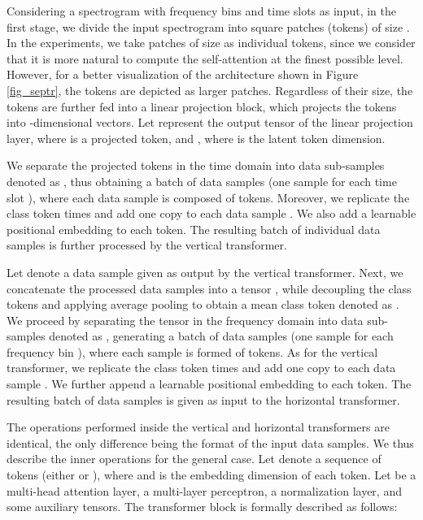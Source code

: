 \documentclass[a4paper]{article}
\begin{document}
Considering a spectrogram with  frequency bins and  time slots as input, in the first stage, we divide the input spectrogram into  square patches (tokens) of size . 
In the experiments, we take patches of size  as individual tokens, since we consider that it is more natural to compute the self-attention at the finest possible level.
However, for a better visualization of the architecture shown in Figure \ref{fig_septr}, the tokens are depicted as larger patches.
Regardless of their size, the tokens are further fed into a linear projection block, which projects the tokens into -dimensional vectors. Let  represent the output tensor of the linear projection layer, where  is a projected token,  and , where  is the latent token dimension. 

We separate the projected tokens in the time domain into data sub-samples denoted as , thus obtaining a batch of  data samples (one sample for each time slot ), where each data sample is composed of  tokens. Moreover, we replicate the class token   times and add one copy to each data sample . We also add a learnable positional embedding to each token. The resulting batch of  individual data samples is further processed by the vertical transformer. 

Let  denote a data sample given as output by the vertical transformer. Next, we concatenate the processed data samples into a tensor , while decoupling the class tokens and applying average pooling to obtain a mean class token denoted as . We proceed by separating the tensor  in the frequency domain into data sub-samples denoted as , generating a batch of  data samples (one sample for each frequency bin ), where each sample is formed of  tokens. As for the vertical transformer, we replicate the class token   times and add one copy to each data sample . We further append a learnable positional embedding to each token. The resulting batch of  data samples is given as input to the horizontal transformer.



The operations performed inside the vertical and horizontal transformers are identical, the only difference being the format of the input data samples. We thus describe the inner operations for the general case. Let  denote a sequence of  tokens (either  or ), where  and  is the embedding dimension of each token. Let  be a multi-head attention layer,  a multi-layer perceptron,  a normalization layer, and  some auxiliary tensors. The transformer block is formally described as follows:
\end{document}
